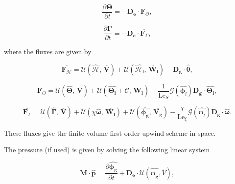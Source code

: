 \documentclass[a4paper,11pt]{article}
\numberwithin{equation}{section}
\begin{document}
\begin{equation}\label{eq:discretised-salt}
\frac{\partial \boldsymbol{\Theta}}{\partial t} = -\boldsymbol{D_e} \cdot \overline{\boldsymbol{F}_\Theta},
\end{equation}

\begin{equation}\label{eq:discretised-gas}
\frac{\partial \boldsymbol{\Gamma}}{\partial t} = -\boldsymbol{D_e} \cdot \overline{\boldsymbol{F}_\Gamma},
\end{equation}

where the fluxes are given by

\begin{equation}\label{eq:enthalpy-flux}
\overline{\boldsymbol{F}_\mathcal{H}} =
\mathcal{U}(\boldsymbol{\hat{\mathcal{H}}}, \, \overline{\boldsymbol{V}})
+ \mathcal{U}(\hat{\boldsymbol{\mathcal{H}_l}}, \, \overline{\boldsymbol{W_l}})
- \boldsymbol{D_g} \cdot \hat{\boldsymbol{\theta}},
\end{equation}

\begin{equation}\label{eq:salt-flux}
\overline{\boldsymbol{F}_\Theta} =
\mathcal{U}(\boldsymbol{\hat{\Theta}}, \, \overline{\boldsymbol{V}})
+ \mathcal{U}(\hat{\boldsymbol{\Theta_l}} + \mathcal{C}, \, \overline{\boldsymbol{W_l}})
-\frac{1}{\text{Le}_S} \mathcal{G}(\hat{\boldsymbol{\phi}_l}) \boldsymbol{D_g} \cdot \hat{\boldsymbol{\Theta_l}},
\end{equation}

\begin{equation}\label{eq:gas-flux}
\overline{\boldsymbol{F}_\Gamma} =
\mathcal{U}(\boldsymbol{\hat{\Gamma}}, \, \overline{\boldsymbol{V}})
+ \mathcal{U}(\chi \hat{\boldsymbol{\omega}}, \, \overline{\boldsymbol{W_l}})
+ \mathcal{U}(\hat{\boldsymbol{\phi_g}}, \, \overline{\boldsymbol{V_g}})
- \frac{\chi}{\text{Le}_\xi} \mathcal{G}(\hat{\boldsymbol{\phi}_l}) \boldsymbol{D_g} \cdot \hat{\boldsymbol{\omega}}.
\end{equation}

These fluxes give the finite volume first order upwind scheme in space.

The pressure (if used) is given by solving the following linear system

\begin{equation}\label{eq:pressure-solve}
\boldsymbol{M} \cdot \hat{\boldsymbol{p}} = 
\frac{\partial \hat{\boldsymbol{\phi_g}}}{\partial t}
+ \boldsymbol{D_e} \cdot \mathcal{U}(\hat{\boldsymbol{\phi_g}}, \overline{V}),
\end{equation}
\end{document}
